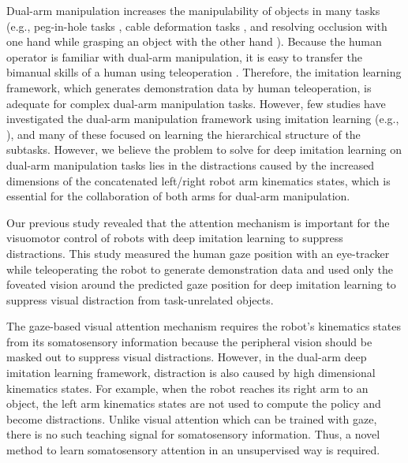 \documentclass[letterpaper, 10 pt, conference]{ieeeconf}  %
\renewcommand\hl[1]{#1} %
\begin{document}
Dual-arm manipulation increases the manipulability of objects in many tasks \cite{smith2012dual} (e.g., peg-in-hole tasks \cite{suarez2015using}, cable deformation tasks \cite{Zhu2018dual}, and resolving occlusion with one hand while grasping an object with the other hand \cite{sepulveda2020robotic}). Because the human operator is familiar with dual-arm manipulation, it is easy to transfer the bimanual skills of a human using teleoperation \cite{smith2012dual}. Therefore, the imitation learning framework, which generates demonstration data by human teleoperation, is adequate for complex dual-arm manipulation tasks.
However, few studies have investigated the dual-arm manipulation framework using imitation learning (e.g., \cite{asfour2008imitation,caccavale2017imitation,xie2020deep}), and many of these focused on learning the hierarchical structure of the subtasks. However, we believe the problem to solve for deep imitation learning on dual-arm manipulation tasks lies in the distractions caused by the increased dimensions of the concatenated left/right robot arm kinematics states, which is essential for the collaboration of both arms for dual-arm manipulation. 

Our previous study revealed that the attention mechanism is important for the visuomotor control of robots with deep imitation learning \cite{kim2020using} to suppress distractions. This study measured the human gaze position with an eye-tracker while teleoperating the robot to generate demonstration data and used only the foveated vision around the predicted gaze position for deep imitation learning to suppress visual distraction from task-unrelated objects. 

\hl{
The gaze-based visual attention mechanism requires the robot's kinematics states from its somatosensory information because the peripheral vision should be masked out to suppress visual distractions. However, in the dual-arm deep imitation learning framework, distraction is also caused by high dimensional kinematics states. For example, when the robot reaches its right arm to an object, the left arm kinematics states are not used to compute the policy and become distractions. }%
\hl{Unlike visual attention which can be trained with gaze, there is no such teaching signal for somatosensory information. Thus, a novel method to learn somatosensory attention in an unsupervised way is required.}
\end{document}
